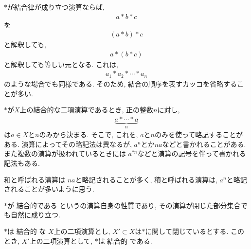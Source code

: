 \begin{remark}
  $\ast$が結合律が成り立つ演算ならば,
  \begin{align*}
    a\ast b \ast c
  \end{align*}
  を
  \begin{align*}
    (a\ast b) \ast c
  \end{align*}
  と解釈しても,
  \begin{align*}
    a\ast (b \ast c)
  \end{align*}
  と解釈しても等しい元となる.
  これは,
  \begin{align*}
    a_1\ast a_2 \ast \cdots \ast a_n
  \end{align*}
  のような場合でも同様である.
  そのため,
  結合の順序を表すカッコを省略することが多い.
\end{remark}
\begin{remark}
  $\ast$が$X$上の結合的な二項演算であるとき,
  正の整数$n$に対し,
  \begin{align*}
    \underbrace{a\ast \cdots \ast a}_{n}
  \end{align*}
  は$a\in X$と$n$のみから決まる.
  そこで, これを, $a$と$n$のみを使って略記することがある.
  演算によってその略記法は異なるが,
  $a^n$とか$na$などと書かれることがある.
  また複数の演算が扱われているときには
  $a^{\ast n}$などと演算の記号を伴って書かれる記法もある.

  和と呼ばれる演算は
  $na$と略記されることが多く,
  積と呼ばれる演算は,
  $a^n$と略記されることが多いように思う.
\end{remark}

$\ast$が
結合的である
というの演算自身の性質であり,
その演算が閉じた部分集合でも自然に成り立つ.
\begin{prop}
  $\ast$は
  結合的
  な
  $X$上の二項演算とし,
  $X'\subset X$は$\ast$に関して閉じているとする.
  このとき,
  $X'$上の二項演算として,
  $\ast$は
  結合的
  である.
\end{prop}



